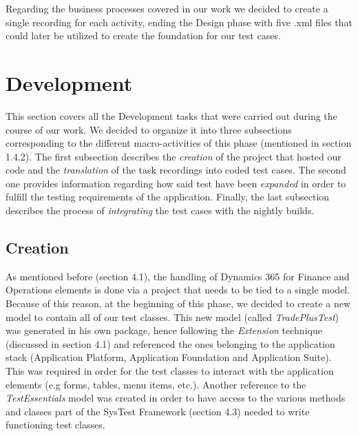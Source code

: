 Regarding the business processes covered in our work we decided to create a single recording for each activity, ending the Design phase with five .xml files that could later be utilized to create the foundation for our test cases.

\section{Development} 

This section covers all the Development tasks that were carried out during the course of our work. We decided to organize it into three subsections corresponding to the different macro-activities of this phase (mentioned in section 1.4.2). The first subsection describes the \textit{creation} of the project that hosted our code and the \textit{translation} of the task recordings into coded test cases. The second one provides information regarding how said test have been \textit{expanded} in order to fulfill the testing requirements of the application. Finally, the last subsection describes the process of \textit{integrating} the test cases with the nightly builds.

\subsection{Creation}

As mentioned before (section 4.1), the handling of Dynamics 365 for Finance and Operations elements is done via a project that needs to be tied to a single model. Because of this reason, at the beginning of this phase, we decided to create a new model to contain all of our test classes. This new model (called \textit{TradePlusTest}) was generated in his own package, hence following the \textit{Extension} technique (discussed in section 4.1) and referenced the ones belonging to the application stack (Application Platform, Application Foundation and Application Suite). This was required in order for the test classes to interact with the application elements (e.g forms, tables, menu items, etc.). Another reference to the \textit{TestEssentials} model was created in order to have access to the various methods and classes part of the SysTest Framework (section 4.3) needed to write functioning test classes.

